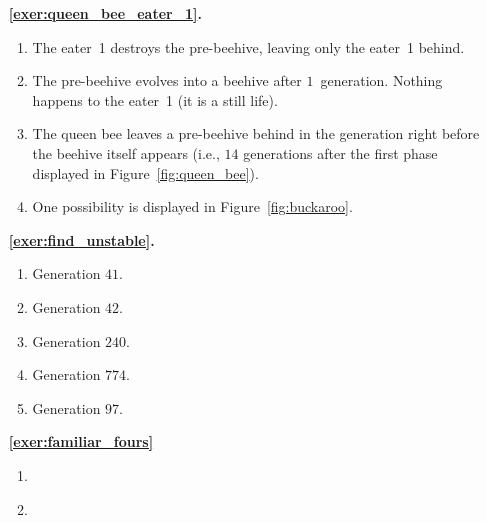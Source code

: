 \begin{multicols}{2}
\begin{itemize}[leftmargin=0em]
		
		\item[\bf\color{ocre}\sffamily\ref{exer:queen_bee_eater_1}.] \begin{enumerate}[leftmargin=1.5em,label=\bf\color{ocre}(\alph*)]
			\item The eater~1 destroys the pre-beehive, leaving only the eater~1 behind.
			
			\item The pre-beehive evolves into a beehive after $1$~generation. Nothing happens to the eater~1 (it is a still life).
			
			\item The queen bee leaves a pre-beehive behind in the generation right before the beehive itself appears (i.e., $14$ generations after the first phase displayed in Figure~\ref{fig:queen_bee}).
			
			\item One possibility is displayed in Figure~\ref{fig:buckaroo}. \\
		\end{enumerate} 
		
		
		\item[\bf\color{ocre}\sffamily\ref{exer:find_unstable}.] \begin{enumerate}[leftmargin=1.5em,label=\bf\color{ocre}(\alph*)]
			\item Generation $41$.
			
			\item Generation $42$.
			
			\item Generation $240$.
			
			\item Generation $774$.
			
			\item Generation $97$. \\
		\end{enumerate}
		
		
		\item[\bf\color{ocre}\sffamily\ref{exer:familiar_fours}]
		\begin{enumerate}[leftmargin=1.5em,label=\bf\color{ocre}(\alph*)]
			\item {}
			
			\item {} \\
		\end{enumerate}
		

\end{itemize}
\end{multicols}
